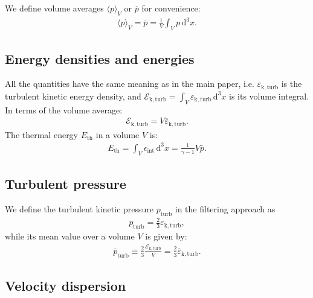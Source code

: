 \documentclass[]{article}
\newcommand{\ud}{\,\mathrm{d}}
\begin{document}
We define volume averages $\langle p \rangle_V$ or $\overline{p}$ for convenience:
%
\begin{align}
	\langle p \rangle_V = \overline{p} = \frac{1}{V} \int_V p \ud^3 x.
\end{align}

\subsection{Energy densities and energies}

All the quantities have the same meaning as in the main paper, i.e. $\varepsilon_{\mathrm{k,turb}}$ is the turbulent kinetic energy density, and $\mathcal{E}_{\mathrm{k,turb}} = \int_V \varepsilon_{\mathrm{k,turb}} \ud^3 x$ is its volume integral. In terms of the volume average:
%
\begin{align}
	\mathcal{E}_{\mathrm{k,turb}} = V \overline{\varepsilon}_{\mathrm{k,turb}}.
\end{align}
%
The thermal energy $E_{\mathrm{th}}$ in a volume $V$ is:
%
\begin{align}
	E_{\mathrm{th}} =  \int_V \epsilon_{\mathrm{int}} \ud^3 x = \frac{1}{\gamma - 1} V \overline{p}.
\end{align}
%

\subsection{Turbulent pressure}

We define the turbulent kinetic pressure $p_{\mathrm{turb}}$ in the filtering approach as 
%
\begin{align}\label{eq:turb-press}
	p_{\mathrm{turb}} = \frac{2}{3} \varepsilon_{\mathrm{k,turb}},
\end{align}
%
while its mean value over a volume $V$ is given by:
%
\begin{align}
	\overline{p}_{\mathrm{turb}} \equiv \frac{2}{3} \frac{\mathcal{E}_{\mathrm{k,turb}}}{V} = \frac{2}{3} \overline{\varepsilon}_{\mathrm{k,turb}}.
\end{align}



\subsection{Velocity dispersion}
\end{document}
